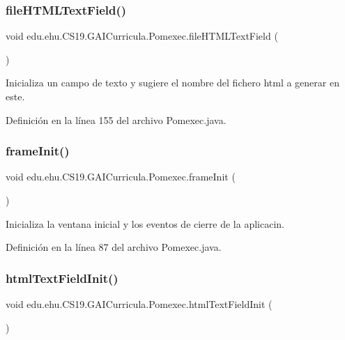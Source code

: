 \subsubsection{\texorpdfstring{fileHTMLTextField()}{fileHTMLTextField()}}
{\footnotesize\ttfamily void edu.\+ehu.\+C\+S19.\+G\+A\+I\+Curricula.\+Pomexec.\+file\+H\+T\+M\+L\+Text\+Field (\begin{DoxyParamCaption}{ }\end{DoxyParamCaption})}



Inicializa un campo de texto y sugiere el nombre del fichero html a generar en este. 



Definición en la línea 155 del archivo Pomexec.\+java.

\mbox{\label{a00029_a1542762d65badb0de4c9e00d793acd37}} 
\subsubsection{\texorpdfstring{frameInit()}{frameInit()}}
{\footnotesize\ttfamily void edu.\+ehu.\+C\+S19.\+G\+A\+I\+Curricula.\+Pomexec.\+frame\+Init (\begin{DoxyParamCaption}{ }\end{DoxyParamCaption})}



Inicializa la ventana inicial y los eventos de cierre de la aplicaci{\ucr}n. 



Definición en la línea 87 del archivo Pomexec.\+java.

\mbox{\label{a00029_aac5d95af4efdb3dc20e305283cedef95}} 
\subsubsection{\texorpdfstring{htmlTextFieldInit()}{htmlTextFieldInit()}}
{\footnotesize\ttfamily void edu.\+ehu.\+C\+S19.\+G\+A\+I\+Curricula.\+Pomexec.\+html\+Text\+Field\+Init (\begin{DoxyParamCaption}{ }\end{DoxyParamCaption})}



